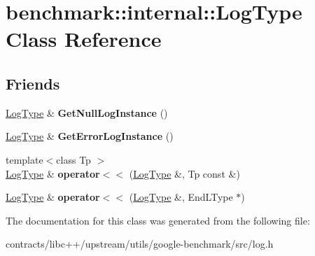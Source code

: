 \hypertarget{classbenchmark_1_1internal_1_1_log_type}{}\section{benchmark\+:\+:internal\+:\+:Log\+Type Class Reference}
\label{classbenchmark_1_1internal_1_1_log_type}
\subsection*{Friends}
\begin{DoxyCompactItemize}
\item 
\mbox{\label{classbenchmark_1_1internal_1_1_log_type_ae3b69aa5e0156cfadb1bf06be8ca2a6c}} 
\mbox{\hyperlink{classbenchmark_1_1internal_1_1_log_type}{Log\+Type}} \& {\bfseries Get\+Null\+Log\+Instance} ()
\item 
\mbox{\label{classbenchmark_1_1internal_1_1_log_type_a2a8ab66b9d1e7d986eafa829be97de70}} 
\mbox{\hyperlink{classbenchmark_1_1internal_1_1_log_type}{Log\+Type}} \& {\bfseries Get\+Error\+Log\+Instance} ()
\item 
\mbox{\label{classbenchmark_1_1internal_1_1_log_type_a51977218828dc0831b493b3228a94682}} 
{\footnotesize template$<$class Tp $>$ }\\\mbox{\hyperlink{classbenchmark_1_1internal_1_1_log_type}{Log\+Type}} \& {\bfseries operator$<$$<$} (\mbox{\hyperlink{classbenchmark_1_1internal_1_1_log_type}{Log\+Type}} \&, Tp const \&)
\item 
\mbox{\label{classbenchmark_1_1internal_1_1_log_type_afca3579a0c4c293f25cb3e93937ce983}} 
\mbox{\hyperlink{classbenchmark_1_1internal_1_1_log_type}{Log\+Type}} \& {\bfseries operator$<$$<$} (\mbox{\hyperlink{classbenchmark_1_1internal_1_1_log_type}{Log\+Type}} \&, End\+L\+Type $\ast$)
\end{DoxyCompactItemize}


The documentation for this class was generated from the following file\+:\begin{DoxyCompactItemize}
\item 
contracts/libc++/upstream/utils/google-\/benchmark/src/log.\+h\end{DoxyCompactItemize}
